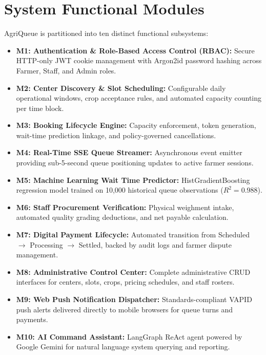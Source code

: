 \section{System Functional Modules}

AgriQueue is partitioned into ten distinct functional subsystems:
\begin{itemize}
  \item \textbf{M1: Authentication \& Role-Based Access Control (RBAC):} Secure HTTP-only JWT cookie management with Argon2id password hashing across Farmer, Staff, and Admin roles.
  \item \textbf{M2: Center Discovery \& Slot Scheduling:} Configurable daily operational windows, crop acceptance rules, and automated capacity counting per time block.
  \item \textbf{M3: Booking Lifecycle Engine:} Capacity enforcement, token generation, wait-time prediction linkage, and policy-governed cancellations.
  \item \textbf{M4: Real-Time SSE Queue Streamer:} Asynchronous event emitter providing sub-5-second queue positioning updates to active farmer sessions.
  \item \textbf{M5: Machine Learning Wait Time Predictor:} HistGradientBoosting regression model trained on 10,000 historical queue observations ($R^2 = 0.988$).
  \item \textbf{M6: Staff Procurement Verification:} Physical weighment intake, automated quality grading deductions, and net payable calculation.
  \item \textbf{M7: Digital Payment Lifecycle:} Automated transition from Scheduled $\to$ Processing $\to$ Settled, backed by audit logs and farmer dispute management.
  \item \textbf{M8: Administrative Control Center:} Complete administrative CRUD interfaces for centers, slots, crops, pricing schedules, and staff rosters.
  \item \textbf{M9: Web Push Notification Dispatcher:} Standards-compliant VAPID push alerts delivered directly to mobile browsers for queue turns and payments.
  \item \textbf{M10: AI Command Assistant:} LangGraph ReAct agent powered by Google Gemini for natural language system querying and reporting.
\end{itemize}
